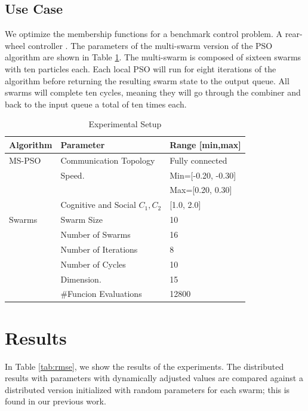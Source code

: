\documentclass[runningheads]{llncs}
\begin{document}
\subsection{Use Case}\label{sub:use_case}

We optimize the membership functions for a benchmark control problem. A rear-wheel controller \cite{paden_survey_2016}. The parameters of the multi-swarm version of the PSO algorithm are shown in Table  \ref{tab:alg_params}.
The multi-swarm is composed of sixteen swarms with ten particles each. Each local PSO will run for eight iterations of the algorithm before returning the resulting swarm state to the output queue. All swarms will complete ten cycles, meaning they will go through the combiner and back to the input queue a total of ten times each.


\begin{table}[htbp] 
\caption{Experimental Setup}\label{tab:alg_params}
\setlength{\tabcolsep}{10pt}
\begin{tabular}{l l l}
\hline
\textbf{Algorithm} & \textbf{Parameter}	& \textbf{Range [min,max]}\\ \hline
MS-PSO & Communication Topology & Fully connected  \\
& Speed.       & Min=[-0.20, -0.30] \\
&              & Max=[0.20, 0.30]  \\
& Cognitive and Social $C_1,C_2$ &  [1.0, 2.0]  \\ \hline
Swarms      & Swarm Size              & 10  \\
            & Number of Swarms        & 16 \\
            & Number of Iterations    &  8 \\
            & Number of Cycles        & 10   \\
            & Dimension.              & 15   \\   
            & \#Funcion Evaluations           & 12800 \\ \hline
\end{tabular}
\end{table}

\section{Results}\label{sec:results}

In Table \ref{tab:rmse}, we show the results of the experiments. The distributed results with parameters with dynamically adjusted values are compared against a distributed version initialized with random parameters for each swarm; this is found in our previous work.
\end{document}
